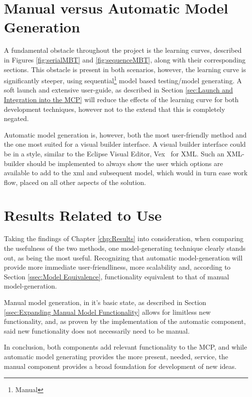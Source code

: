 \section{Manual versus Automatic Model Generation}
A fundamental obstacle throughout the project is the learning curves, described in Figures \ref{fig:serialMBT} and \ref{fig:sequenceMBT}, along with their corresponding sections. This obstacle is present in both scenarios, however, the learning curve is significantly steeper, using sequential\footnote{Manual} model based testing/model generating. A soft launch and extensive user-guide, as described in Section \ref{sec:Launch and Integration into the MCP} will reduce the effects of the learning curve for both development techniques, however not to the extend that this is completely negated.

Automatic model generation is, however, both the most user-friendly method and the one most suited for a visual builder interface. A visual builder interface could be in a style, similar to the Eclipse Visual Editor, Vex~\cite{vex} for XML. Such an XML-builder should be implemented to always show the user which options are available to add to the xml and subsequent model, which would in turn ease work flow, placed on all other aspects of the solution.

\section{Results Related to Use}
Taking the findings of Chapter \ref{chp:Results} into consideration, when comparing the usefulness of the two methods, one model-generating technique clearly stands out, as being the most useful. Recognizing that automatic model-generation will provide more immediate user-friendliness, more scalability and, according to Section \ref{ssec:Model Equivalence}, functionality equivalent to that of manual model-generation.

Manual model generation, in it's basic state, as described in Section \ref{ssec:Expanding Manual Model Functionality} allows for limitless new functionality, and, as proven by the implementation of the automatic component, said new functionality does not necessarily need to be manual.

In conclusion, both components add relevant functionality to the MCP, and while automatic model generating provides the more present, needed, service, the manual component provides a broad foundation for development of new ideas.


